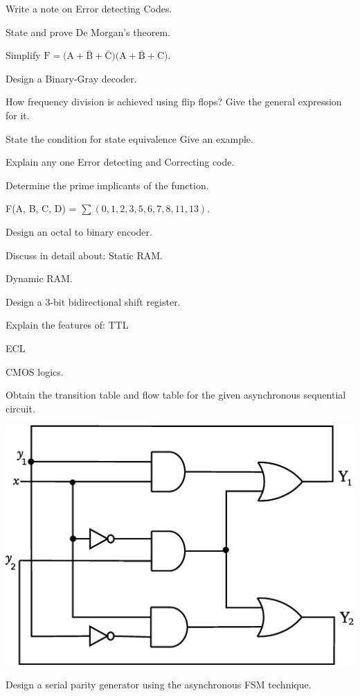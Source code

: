 \markA
\partB

\item Write a note on Error detecting Codes.
\item State and prove De Morgan's theorem.
\item Simplify $\text{F} = \text{(A} + \bar{\text{B}} + \bar{\text{C}} \text{)}
 \text{(A} + \bar{\text{B}} + \text{C} \text{)}$.
\item Design a Binary-Gray decoder.
\item How frequency division is achieved using flip flops? Give the general expression
  for it.
\item State the condition for state equivalence Give an example.

\markB
\partC

\item \iitem Explain any one Error detecting and Correcting code.
\Or
\item Determine the prime implicants of the function.

  F(A, B, C, D) = $\sum (0, 1, 2, 3, 5, 6, 7, 8, 11, 13)$.
\ene

\newpage \again

\item \iitem Design an octal to binary encoder.
\Or
\item Discuss in detail about:
\iitem Static RAM.
\item Dynamic RAM.
\ene \ene

\item \iitem Design a 3-bit bidirectional shift register.
\Or
\item Explain the features of:
\iitem TTL
\item ECL
\item CMOS
\ene
logics.
\ene


\item \iitem Obtain the transition table and flow table for the given asynchronous sequential circuit.

\begin{center}
\includegraphics[scale=0.3]{src/s3/ai/09_305/digi1}
\end{center}
\Or
\item Design a serial parity generator using the asynchronous FSM technique.
\ene 

